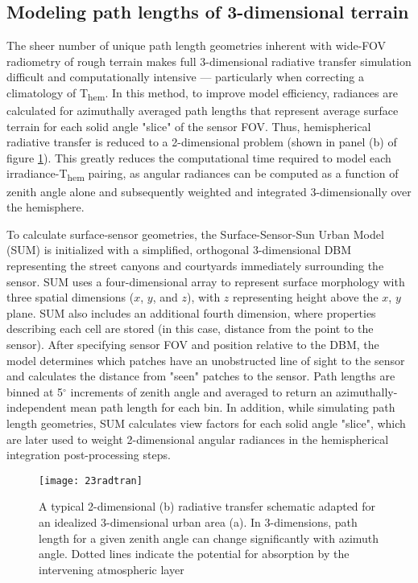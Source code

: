 \subsection{Modeling path lengths of 3-dimensional terrain}

The sheer number of unique path length geometries inherent with wide-FOV radiometry of rough terrain makes full 3-dimensional radiative transfer simulation difficult and computationally intensive --- particularly when correcting a climatology of T\textsubscript{hem}. In this method, to improve model efficiency, radiances are calculated for azimuthally averaged path lengths that represent average surface terrain for each solid angle "slice" of the sensor FOV. Thus, hemispherical radiative transfer is reduced to a 2-dimensional problem (shown in panel (b) of figure \ref{23radtran}). This greatly reduces the computational time required to model each irradiance-T\textsubscript{hem} pairing, as angular radiances can be computed as a function of zenith angle alone and subsequently weighted and integrated 3-dimensionally over the hemisphere. 

To calculate surface-sensor geometries, the Surface-Sensor-Sun Urban Model (SUM) \cite{Soux2004} is initialized with a simplified, orthogonal 3-dimensional DBM representing the street canyons and courtyards immediately surrounding the sensor. SUM uses a four-dimensional array to represent surface morphology   with three spatial dimensions ($x$, $y$, and $z$), with $z$ representing height above the $x$, $y$ plane. SUM also includes an additional fourth dimension, where properties describing each cell are stored (in this case, distance from the point to the sensor). After specifying sensor FOV and position relative to the DBM, the model determines which patches have an unobstructed line of sight to the sensor and calculates the distance from "seen" patches to the sensor. Path lengths are binned at 5$^{\circ}$ increments of zenith angle and averaged to return an azimuthally-independent mean path length for each bin. In addition, while simulating path length geometries, SUM calculates view factors for each solid angle "slice", which are later used to weight 2-dimensional angular radiances in the hemispherical integration post-processing steps.

\begin{figure}[!ht]
	\texttt{[image: 23radtran]}
	\label{23radtran}
	\caption{A typical 2-dimensional (b) radiative transfer schematic adapted for an idealized 3-dimensional urban area (a). In 3-dimensions, path length for a given zenith angle can change significantly with azimuth angle. Dotted lines indicate the potential for absorption by the intervening atmospheric layer}
\end{figure}

